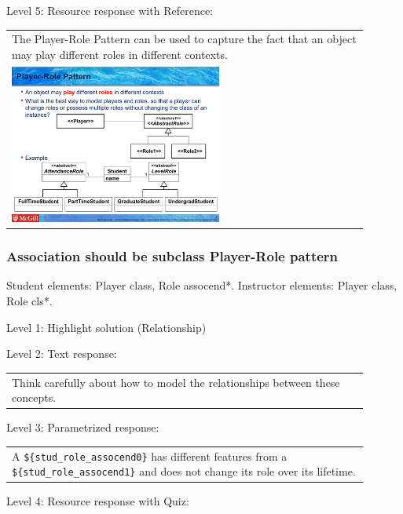 \noindent Level 5: Resource response with Reference: \medskip

\begin{tabular}{|p{0.9\linewidth}}
The Player-Role Pattern can be used to capture the fact that an object may play different roles
in different contexts.

\\
\includegraphics[width=0.6\textwidth]{images/player_role.png}
\end{tabular} \medskip


\subsubsection{Association should be subclass Player-Role pattern}

Student elements: Player class, Role assocend*. Instructor elements: Player class, Role cls*. \medskip

\noindent Level 1: Highlight solution (Relationship) \medskip

\noindent Level 2: Text response: \medskip

\begin{tabular}{|p{0.9\linewidth}}
Think carefully about how to model the relationships between these concepts.
\end{tabular} \medskip

\noindent Level 3: Parametrized response: \medskip

\begin{tabular}{|p{0.9\linewidth}}
A \verb|${stud_role_assocend0}| has different features from a \verb|${stud_role_assocend1}| and does not change its role over its lifetime.
\end{tabular} \medskip

\noindent Level 4: Resource response with Quiz: \medskip


